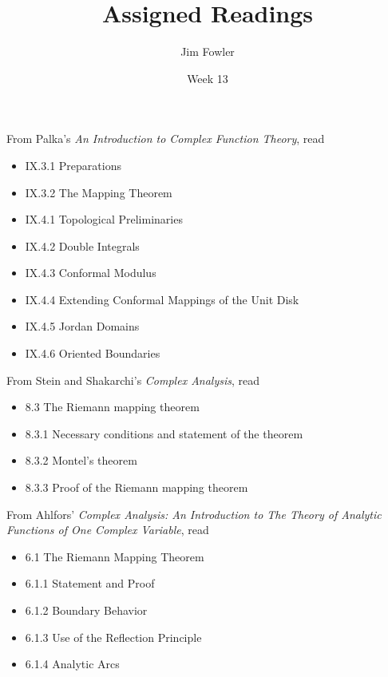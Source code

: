 \documentclass{homework}
\author{Jim Fowler}
\title{Assigned Readings}
\date{Week 13}
\begin{document}
\maketitle


From Palka's \textit{An Introduction to Complex Function Theory}, read
\begin{itemize}
\item IX.3.1 Preparations
\item IX.3.2 The Mapping Theorem
\item IX.4.1 Topological Preliminaries
\item IX.4.2 Double Integrals
\item IX.4.3 Conformal Modulus
\item IX.4.4 Extending Conformal Mappings of the Unit Disk
\item IX.4.5 Jordan Domains
\item IX.4.6 Oriented Boundaries
\end{itemize}

From Stein and Shakarchi's \textit{Complex Analysis}, read
\begin{itemize}
\item 8.3 The Riemann mapping theorem
\item 8.3.1 Necessary conditions and statement of the theorem
\item 8.3.2 Montel's theorem
\item 8.3.3 Proof of the Riemann mapping theorem
\end{itemize}

From Ahlfors' \textit{Complex Analysis: An Introduction to The Theory of Analytic Functions of One Complex Variable}, read
\begin{itemize}
\item 6.1 The Riemann Mapping Theorem
\item 6.1.1 Statement and Proof
\item 6.1.2 Boundary Behavior
\item 6.1.3 Use of the Reflection Principle
\item 6.1.4 Analytic Arcs
\end{itemize}
\end{document}
